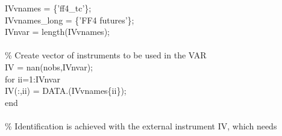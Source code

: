 \hspace{1mm}\hspace{5mm} \hspace{5mm} IVvnames      = \{\textcolor{matlabpurple}{'ff4\_tc'}\}; \\ 
\hspace{1mm}\hspace{5mm} \hspace{5mm} IVvnames\_long = \{\textcolor{matlabpurple}{'FF4 futures'}\}; \\ 
\hspace{1mm}\hspace{5mm} \hspace{5mm} IVnvar        = length(IVvnames); \\ 
\hspace{1mm}\hspace{5mm} \hspace{5mm}  \\ 
\hspace{1mm}\hspace{5mm} \hspace{5mm} \textcolor{matlabgreen}{\% Create vector of instruments to be used in the VAR }\\ 
\hspace{1mm}\hspace{5mm} \hspace{5mm} IV = nan(nobs,IVnvar); \\ 
\hspace{1mm}\hspace{5mm} \hspace{5mm} \textcolor{matlabblue}{for} ii=1:IVnvar \\ 
\hspace{1mm}\hspace{5mm} \hspace{5mm} \hspace{5mm} IV(:,ii) = DATA.(IVvnames\{ii\}); \\ 
\hspace{1mm}\hspace{5mm} \hspace{5mm} \textcolor{matlabblue}{end} \\ 
\hspace{1mm}\hspace{5mm} \hspace{5mm}  \\ 
\hspace{1mm}\hspace{5mm} \hspace{5mm} \textcolor{matlabgreen}{\% Identification is achieved with the external instrument IV, which needs }\\ 
